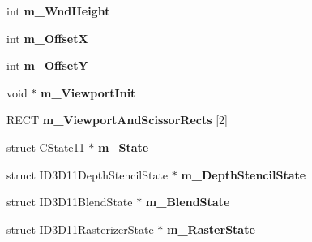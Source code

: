 \begin{DoxyCompactItemize}
\item 
\hypertarget{class_c_tw_graph_direct3_d11_ad585f34acc82a42430fc42782e677a78}{int {\bfseries m\+\_\+\+Wnd\+Height}}\label{class_c_tw_graph_direct3_d11_ad585f34acc82a42430fc42782e677a78}

\item 
\hypertarget{class_c_tw_graph_direct3_d11_ae5055112a11e189b67a50a2fdb9b30dc}{int {\bfseries m\+\_\+\+Offset\+X}}\label{class_c_tw_graph_direct3_d11_ae5055112a11e189b67a50a2fdb9b30dc}

\item 
\hypertarget{class_c_tw_graph_direct3_d11_a915aeeb8e36ece1396f207b222f6ec7b}{int {\bfseries m\+\_\+\+Offset\+Y}}\label{class_c_tw_graph_direct3_d11_a915aeeb8e36ece1396f207b222f6ec7b}

\item 
\hypertarget{class_c_tw_graph_direct3_d11_a4eba26e5619af7f9e4d610e7427f5d19}{void $\ast$ {\bfseries m\+\_\+\+Viewport\+Init}}\label{class_c_tw_graph_direct3_d11_a4eba26e5619af7f9e4d610e7427f5d19}

\item 
\hypertarget{class_c_tw_graph_direct3_d11_aa1621a5b6715dc2bf219e86c9b4e286f}{R\+E\+C\+T {\bfseries m\+\_\+\+Viewport\+And\+Scissor\+Rects} \mbox{[}2\mbox{]}}\label{class_c_tw_graph_direct3_d11_aa1621a5b6715dc2bf219e86c9b4e286f}

\item 
\hypertarget{class_c_tw_graph_direct3_d11_a456705845d6d15f8c25aa209f1be7cfc}{struct \hyperlink{struct_c_state11}{C\+State11} $\ast$ {\bfseries m\+\_\+\+State}}\label{class_c_tw_graph_direct3_d11_a456705845d6d15f8c25aa209f1be7cfc}

\item 
\hypertarget{class_c_tw_graph_direct3_d11_a98cd23f873b5dc9e035240e188a7f236}{struct I\+D3\+D11\+Depth\+Stencil\+State $\ast$ {\bfseries m\+\_\+\+Depth\+Stencil\+State}}\label{class_c_tw_graph_direct3_d11_a98cd23f873b5dc9e035240e188a7f236}

\item 
\hypertarget{class_c_tw_graph_direct3_d11_a39c93b0ab8393cbe5aaa9878fcff285e}{struct I\+D3\+D11\+Blend\+State $\ast$ {\bfseries m\+\_\+\+Blend\+State}}\label{class_c_tw_graph_direct3_d11_a39c93b0ab8393cbe5aaa9878fcff285e}

\item 
\hypertarget{class_c_tw_graph_direct3_d11_a0d5fa253e727e2e28a2f16ad08705cff}{struct I\+D3\+D11\+Rasterizer\+State $\ast$ {\bfseries m\+\_\+\+Raster\+State}}\label{class_c_tw_graph_direct3_d11_a0d5fa253e727e2e28a2f16ad08705cff}


\end{DoxyCompactItemize}
